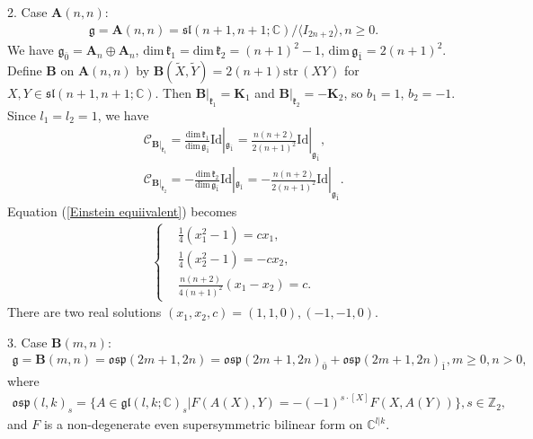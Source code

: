 \documentclass[reqno]{amsart}
\theoremstyle{definition}
\begin{document}
2. Case $\mathbf{A}(n,n)$:
\begin{eqnarray*}
\mathfrak{g}=\mathbf{A}(n,n)=\mathfrak{sl}(n+1,n+1; \mathbb{C})/\langle I_{2n+2}\rangle,n\geq 0.
\end{eqnarray*}
We have
$\mathfrak{g}_{\bar{0}}=\mathbf{A}_{n}\oplus \mathbf{A}_{n}$, $\mathrm{dim}\,\mathfrak{k}_{1}=\mathrm{dim}\,\mathfrak{k}_{2}=(n+1)^{2}-1$, $\mathrm{dim}\,\mathfrak{g}_{\bar{1}}=2(n+1)^{2}$.
 Define $\mathbf{B}$  on $\mathbf{A}(n,n)$  by $\mathbf{B}(\widetilde{X},\widetilde{Y})=2(n+1)\mathrm{str}\,(XY)$
for  $X,Y\in \mathfrak{sl}(n+1,n+1; \mathbb{C})$. Then $\mathbf{B}|_{\mathfrak{k}_{1}}=\mathbf{K}_{1}$ and  $\mathbf{B}|_{\mathfrak{k}_{2}}=-\mathbf{K}_{2}$, so $b_{1}=1$, $b_{2}=-1$. Since  $l_{1}=l_{2}=1$, we have
\begin{eqnarray*}
&&\mathcal{C}_{\mathbf{B}|_{\mathfrak{k}_{1}}}=\frac{\mathrm{dim}\,\mathfrak{k}_{1}}{\mathrm{dim}\,\mathfrak{g}_{\bar{1}}}\mathrm{Id}|_{\mathfrak{g}_{\bar{1}}}
                                            =\frac{n(n+2)}{2(n+1)^{2}}\mathrm{Id}|_{\mathfrak{g}_{\bar{1}}},\\
&&\mathcal{C}_{\mathbf{B}|_{\mathfrak{k}_{2}}}=-\frac{\mathrm{dim}\,\mathfrak{k}_{2}}{\mathrm{dim}\,\mathfrak{g}_{\bar{1}}}\mathrm{Id}|_{\mathfrak{g}_{\bar{1}}}
                                              =-\frac{n(n+2)}{2(n+1)^{2}}\mathrm{Id}|_{\mathfrak{g}_{\bar{1}}}.
\end{eqnarray*}
Equation (\ref{Einstein equiivalent}) becomes
\begin{eqnarray*}
\left\{
\begin{aligned}
&\frac{1}{4}(x_{1}^{2}-1)=c x_{1},\\
&\frac{1}{4}(x_{2}^{2}-1)=-c x_{2},\\
&\frac{n(n+2)}{4(n+1)^{2}}(x_{1}-x_{2})=c.
\end{aligned}\right.
\end{eqnarray*}
There are two real solutions $(x_{1},x_{2},c)=(1,1,0),(-1,-1,0)$.



3. Case $\mathbf{B}(m,n)$:
\begin{eqnarray*}
\mathfrak{g}=\mathbf{B}(m,n)=\mathfrak{osp}(2m+1,2n)=\mathfrak{osp}(2m+1,2n)_{\bar{0}}+\mathfrak{osp}(2m+1,2n)_{\bar{1}},m\geq 0,n> 0,
\end{eqnarray*}
where
\begin{eqnarray*}
\mathfrak{osp}(l,k)_{s}=\{A\in\mathfrak{gl}(l,k;\mathbb{C})_{s}|F(A(X),Y)=-(-1)^{s\cdot[X]}F(X,A(Y))\}, s\in \mathbb{Z}_{2},
\end{eqnarray*}
and $F$ is a non-degenerate even supersymmetric bilinear form on $\mathbb{C}^{l|k}$.
\end{document}
